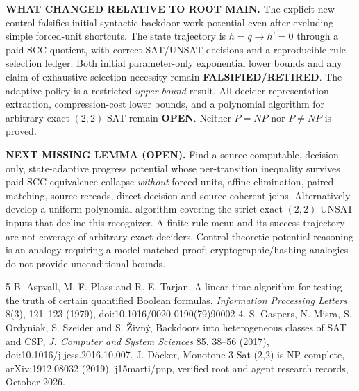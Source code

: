 \documentclass[11pt]{article}
\begin{document}
\textbf{WHAT CHANGED RELATIVE TO ROOT MAIN.} The explicit new control falsifies initial syntactic backdoor work potential even after excluding simple forced-unit shortcuts. The state trajectory is $h=q\to h'=0$ through a paid SCC quotient, with correct SAT/UNSAT decisions and a reproducible rule-selection ledger. Both initial parameter-only exponential lower bounds and any claim of exhaustive selection necessity remain \textbf{FALSIFIED/RETIRED}. The adaptive policy is a restricted \emph{upper-bound} result. All-decider representation extraction, compression-cost lower bounds, and a polynomial algorithm for arbitrary exact-$(2,2)$ SAT remain \textbf{OPEN}. Neither $P=NP$ nor $P\ne NP$ is proved.

\textbf{NEXT MISSING LEMMA (OPEN).} Find a source-computable, decision-only, state-adaptive progress potential whose per-transition inequality survives paid SCC-equivalence collapse \emph{without} forced units, affine elimination, paired matching, source rereads, direct decision and source-coherent joins. Alternatively develop a uniform polynomial algorithm covering the strict exact-$(2,2)$ UNSAT inputs that decline this recognizer. A finite rule menu and its success trajectory are not coverage of arbitrary exact deciders. Control-theoretic potential reasoning is an analogy requiring a model-matched proof; cryptographic/hashing analogies do not provide unconditional bounds.

\begin{thebibliography}{5}
 B. Aspvall, M. F. Plass and R. E. Tarjan, A linear-time algorithm for testing the truth of certain quantified Boolean formulas, \emph{Information Processing Letters} 8(3), 121--123 (1979), doi:10.1016/0020-0190(79)90002-4.
 S. Gaspers, N. Misra, S. Ordyniak, S. Szeider and S. \v{Z}ivn\'y, Backdoors into heterogeneous classes of SAT and CSP, \emph{J. Computer and System Sciences} 85, 38--56 (2017), doi:10.1016/j.jcss.2016.10.007.
 J. D\"ocker, Monotone 3-Sat-(2,2) is NP-complete, arXiv:1912.08032 (2019).
 j15marti/pnp, verified root and agent research records, October 2026.
\end{thebibliography}
\end{document}
